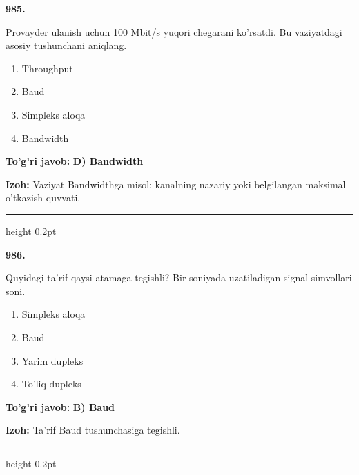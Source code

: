 \documentclass[10pt,a4paper,oneside]{article}
\begin{document}
\noindent\textbf{\color{ink}985.}
\par
Provayder ulanish uchun 100 Mbit/s yuqori chegarani ko'rsatdi. Bu vaziyatdagi asosiy tushunchani aniqlang.
\begin{enumerate}[label=\Alph*),leftmargin=9mm]
\item Throughput
\item Baud
\item Simpleks aloqa
\item Bandwidth
\end{enumerate}
\begin{tcolorbox}[enhanced,breakable,colback=teal!4,colframe=teal!50!black,boxrule=0.5pt,arc=1.1mm,left=3mm,right=3mm,top=1.7mm,bottom=1.7mm,before skip=2mm,after skip=2mm]
\textbf{\color{teal}To'g'ri javob:} \textbf{D) Bandwidth}
\par\smallskip
\textbf{Izoh:} Vaziyat Bandwidthga misol: kanalning nazariy yoki belgilangan maksimal o'tkazish quvvati.
\end{tcolorbox}
\vspace{2mm}\hrule height 0.2pt \vspace{3mm}

\noindent\textbf{\color{ink}986.}
\par
Quyidagi ta'rif qaysi atamaga tegishli? Bir soniyada uzatiladigan signal simvollari soni.
\begin{enumerate}[label=\Alph*),leftmargin=9mm]
\item Simpleks aloqa
\item Baud
\item Yarim dupleks
\item To'liq dupleks
\end{enumerate}
\begin{tcolorbox}[enhanced,breakable,colback=teal!4,colframe=teal!50!black,boxrule=0.5pt,arc=1.1mm,left=3mm,right=3mm,top=1.7mm,bottom=1.7mm,before skip=2mm,after skip=2mm]
\textbf{\color{teal}To'g'ri javob:} \textbf{B) Baud}
\par\smallskip
\textbf{Izoh:} Ta'rif Baud tushunchasiga tegishli.
\end{tcolorbox}
\vspace{2mm}\hrule height 0.2pt \vspace{3mm}
\end{document}
